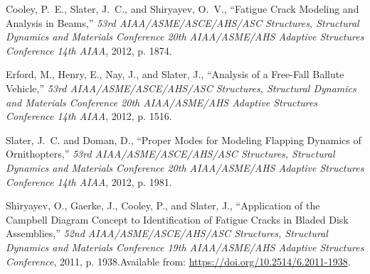 Cooley, P.~E., Slater, J.~C., and Shiryayev, O.~V., ``Fatigue Crack  Modeling and Analysis in Beams,'' \emph{ 53rd AIAA/ASME/ASCE/AHS/ASC Structures,  Structural Dynamics and Materials Conference 20th AIAA/ASME/AHS Adaptive  Structures Conference 14th AIAA\/}, 2012, p. 1874.

Erford, M., Henry, E., Nay, J., and Slater, J., ``Analysis of a  Free-Fall Ballute Vehicle,'' \emph{ 53rd AIAA/ASME/ASCE/AHS/ASC Structures,  Structural Dynamics and Materials Conference 20th AIAA/ASME/AHS Adaptive  Structures Conference 14th AIAA\/}, 2012, p. 1516.

Slater, J.~C. and Doman, D., ``Proper Modes for Modeling Flapping  Dynamics of Ornithopters,'' \emph{ 53rd AIAA/ASME/ASCE/AHS/ASC Structures,  Structural Dynamics and Materials Conference 20th AIAA/ASME/AHS Adaptive  Structures Conference 14th AIAA\/}, 2012, p. 1981.

Shiryayev, O., Gaerke, J., Cooley, P., and Slater, J., ``Application of  the Campbell Diagram Concept to Identification of Fatigue Cracks in Bladed  Disk Assemblies,'' \emph{ 52nd AIAA/ASME/ASCE/AHS/ASC Structures, Structural  Dynamics and Materials Conference 19th AIAA/ASME/AHS Adaptive Structures  Conference\/}, 2011, p. 1938.\newblock Available from: \url{https://doi.org/10.2514/6.2011-1938}.

